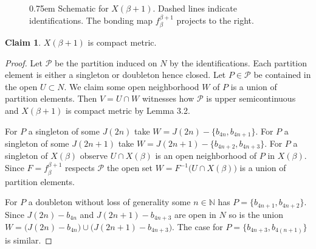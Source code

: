 \documentclass[12pt]{article}
\theoremstyle{plain}
\theoremstyle{definition}
\newcounter{claim5counter}
\newtheorem{claim5}[claim5counter]{Claim}
\newcommand{\B}{\ensuremath{\beta}}
\newcommand{\NN}{\ensuremath{\mathbb N}}
\newcommand{\0}{\ensuremath{\varnothing}}
\newcommand{\cP}{\ensuremath{\mathcal P}}
\begin{document}
\begin{figure}[!h]
		
		\vspace{0.5cm}
		
		\caption{
			\openup 0.75em Schematic for $X(\B+1)$. Dashed lines indicate identifications.
			The bonding map $f^{\B+1}_\B$ projects to the right.}\label{SeparablyBellamySuccessor1Input}
	\end{figure}
	
	
	\begin{claim5}
		$X(\B+1)$ is compact metric.
	\end{claim5}
	
	\begin{proof}
		Let $\cP$ be the partition induced on $N$ by the identifications.
		Each partition element is either a singleton or doubleton hence closed.
		Let $P \in \cP$ be contained in the open $U \subset N$.
		We claim some open neighborhood $W$ of $P$ is a union of partition elements.
		Then $V = U \cap W$ witnesses how $\cP$ is upper semicontinuous and $X(\B+1)$ is compact metric by \cite{nadlerbook} Lemma 3.2.
		
		For $P$ a singleton of some $J(2n)$ take $W = J(2n) - \{b_{4n},b_{4n+1}\}$.
		For $P$ a singleton of some $J(2n+1)$ take $W = J(2n+1) - \{b_{4n+2},b_{4n+3}\}$.
		For $P$ a singleton of $X(\B)$ observe $U \cap X(\B)$ is an open neighborhood of $P$ in $X(\B)$.
		Since $F = f^{\B+1}_\B$ respects $\cP$ the open set $W = F^{-1} \big (U \cap X(\B) \big )$ is a union of partition elements.
		
		For $P$ a doubleton without loss of generality some $n \in \NN$ has $P = \big  \{b_{4n+1}, b_{4n+2} \big \}$.
		Since $J(2n) - b_{4n}$ and $J(2n+1) - b_{4n +3}$ are open in $N$ 
		so is the union $W = \big (J(2n) - b_{4n} \big ) \cup \big (J(2n+1) - b_{4n +3} \big )$.
		The case for $P = \big  \{b_{4n+3}, b_{4(n+1)} \big \}$ is similar.
	\end{proof}
	
\end{document}
